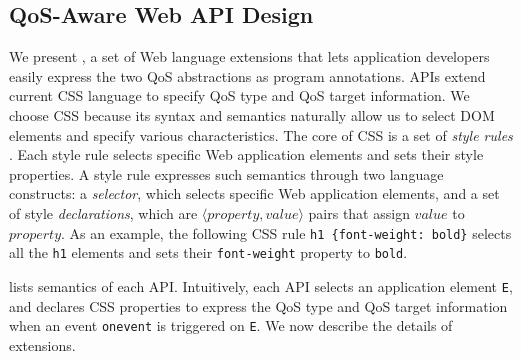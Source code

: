 \subsection{QoS-Aware Web API Design}
\label{sec:lang:spec}


We present \greenweb, a set of Web language extensions that lets application developers easily express the two QoS abstractions as program annotations. \greenweb APIs extend current CSS language to specify QoS type and QoS target information. We choose CSS because its syntax and semantics naturally allow us to select DOM elements and specify various characteristics. The core of CSS is a set of \textit{style rules} \cite{css21}. Each style rule selects specific Web application elements and sets their style properties. A style rule expresses such semantics through two language constructs: a \textit{selector}, which selects specific Web application elements, and a set of style \textit{declarations}, which are $\langle property, value \rangle$ pairs that assign $value$ to $property$. As an example, the following CSS rule \texttt{h1 \{font-weight: bold\}} selects all the \texttt{h1} elements and sets their \texttt{font-weight} property to \texttt{bold}.


 lists semantics of each \greenweb API. Intuitively, each \greenweb API selects an application element \texttt{E}, and declares CSS properties to express the QoS type and QoS target information when an event \texttt{onevent} is triggered on \texttt{E}. We now describe the details of \greenweb extensions.

